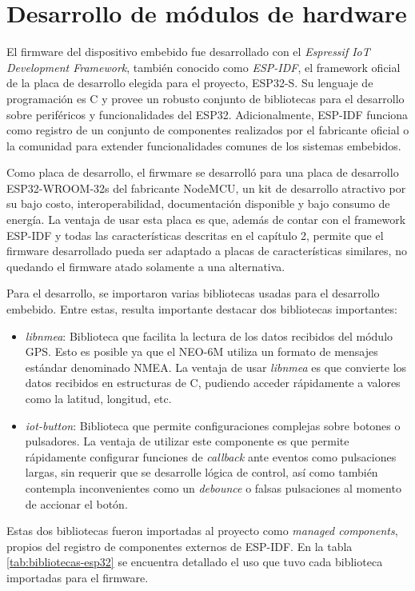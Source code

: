 {\section{Desarrollo de módulos de hardware}

El firmware del dispositivo embebido fue desarrollado con el \textit{Espressif IoT Development Framework}, también conocido como \textit{ESP-IDF}, el framework oficial de la placa de desarrollo elegida para el proyecto, ESP32-S. Su lenguaje de programación es C y provee un robusto conjunto de bibliotecas para el desarrollo sobre periféricos y funcionalidades del ESP32. Adicionalmente, ESP-IDF funciona como registro de un conjunto de componentes realizados por el fabricante oficial o la comunidad para extender funcionalidades comunes de los sistemas embebidos. 

Como placa de desarrollo, el firwmare se desarrolló para una placa de desarrollo ESP32-WROOM-32s del fabricante NodeMCU, un kit de desarrollo atractivo por su bajo costo, interoperabilidad, documentación disponible y bajo consumo de energía. La ventaja de usar esta placa es que, además de contar con el framework ESP-IDF y todas las características descritas en el capítulo 2, permite que el firmware desarrollado pueda ser adaptado a placas de características similares, no quedando el firmware atado solamente a una alternativa.

Para el desarrollo, se importaron varias bibliotecas usadas para el desarrollo embebido. Entre estas, resulta importante destacar dos bibliotecas importantes:
\begin{itemize}
	\item \textit{libnmea}: Biblioteca que facilita la lectura de los datos recibidos del módulo GPS. Esto es posible ya que el NEO-6M utiliza un formato de mensajes estándar denominado NMEA. La ventaja de usar \textit{libnmea} es que convierte los datos recibidos en estructuras de C, pudiendo acceder rápidamente a valores como la latitud, longitud, etc.
	\item \textit{iot-button}: Biblioteca que permite configuraciones complejas sobre botones o pulsadores. La ventaja de utilizar este componente es que permite rápidamente configurar funciones de \textit{callback} ante eventos como pulsaciones largas, sin requerir que se desarrolle lógica de control, así como también contempla inconvenientes como un \textit{debounce} o falsas pulsaciones al momento de accionar el botón.
\end{itemize}

Estas dos bibliotecas fueron importadas al proyecto como \textit{managed components}, propios del registro de componentes externos de ESP-IDF. En la tabla \ref{tab:bibliotecas-esp32} se encuentra detallado el uso que tuvo cada biblioteca importadas para el firmware.

}
